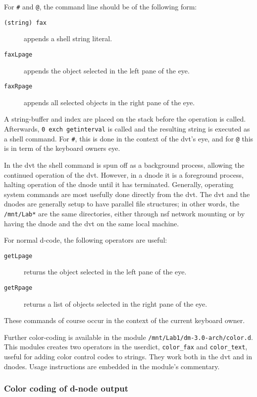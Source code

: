 \documentclass[12pt]{article}
\begin{document}
For \verb$#$ and \verb$@$, the command line should be of the following form:
\begin{description}
  \item[\texttt{(string) fax}] appends a shell string literal.
  \item[\texttt{faxLpage}] appends the object selected in the left
  pane of the eye.
  \item[\texttt{faxRpage}] appends all selected objects in the right
  pane of the eye.
\end{description}
A string-buffer and index are placed on the stack before the operation
is called. Afterwards, \verb$0 exch getinterval$ is called and the
resulting string is executed as a shell command. For \verb$#$, this is
done in the context of the dvt's eye, and for \verb$@$ this is in term
of the keyboard owners eye.

In the dvt the shell command is spun off as a background process,
allowing the continued operation of the dvt. However, in a dnode it is
a foreground process, halting operation of the dnode until it has
terminated. Generally, operating system commands are most usefully
done directly from the dvt. The dvt and the dnodes are generally setup
to have parallel file structures; in other words, the
\texttt{/mnt/Lab*} are the same directories, either through nsf
network mounting or by having the dnode and the dvt on the same local
machine.

For normal d-code, the following operators are useful:
\begin{description}
  \item[\texttt{getLpage}] returns the object selected in the left
  pane of the eye.
  \item[\texttt{getRpage}] returns a list of objects selected in the
  right pane of the eye.
\end{description}
These commands of course occur in the context of the current keyboard
owner.

Further color-coding is available in the module
\texttt{/mnt/Lab1/dm-3.0-arch/color.d}. This modules creates two
operators in the userdict, \verb$color_fax$ and \verb$color_text$,
useful for adding color control codes to strings. They work both in
the dvt and in dnodes. Usage instructions are embedded in the module's
commentary.


\subsubsection{Color coding of d-node output}
\label{sec:color}
\end{document}

